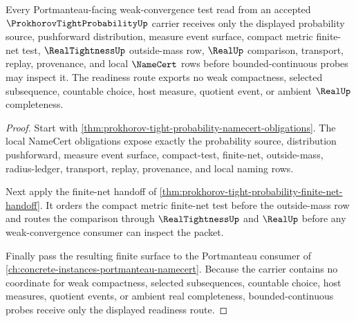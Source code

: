 \begin{theorem}
\label{thm:prokhorov-tight-probability-portmanteau-readiness}
Every Portmanteau-facing weak-convergence test read from an accepted $\ProkhorovTightProbabilityUp$ carrier receives only the displayed probability source, pushforward distribution, measure event surface, compact metric finite-net test, $\RealTightnessUp$ outside-mass row, $\RealUp$ comparison, transport, replay, provenance, and local $\NameCert$ rows before bounded-continuous probes may inspect it. The readiness route exports no weak compactness, selected subsequence, countable choice, host measure, quotient event, or ambient $\RealUp$ completeness.
\end{theorem}
\begin{proof}
Start with \autoref{thm:prokhorov-tight-probability-namecert-obligations}. The local NameCert obligations expose exactly the probability source, distribution pushforward, measure event surface, compact-test, finite-net, outside-mass, radius-ledger, transport, replay, provenance, and local naming rows.

Next apply the finite-net handoff of \autoref{thm:prokhorov-tight-probability-finite-net-handoff}. It orders the compact metric finite-net test before the outside-mass row and routes the comparison through $\RealTightnessUp$ and $\RealUp$ before any weak-convergence consumer can inspect the packet.

Finally pass the resulting finite surface to the Portmanteau consumer of \autoref{ch:concrete-instances-portmanteau-namecert}. Because the carrier contains no coordinate for weak compactness, selected subsequences, countable choice, host measures, quotient events, or ambient real completeness, bounded-continuous probes receive only the displayed readiness route.
\end{proof}



